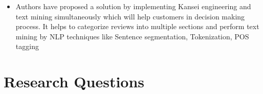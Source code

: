 \documentclass[
  letterpaper,
  DIV=11,
  numbers=noendperiod]{scrreprt}
\providecommand{\tightlist}{%
  \setlength{\itemsep}{0pt}\setlength{\parskip}{0pt}}\usepackage{longtable,booktabs,array}
\begin{document}
\begin{itemize}
\begin{itemize}
    \begin{itemize}
    \tightlist
    \item
      Authors have proposed a solution by implementing Kansei
      engineering and text mining simultaneously which will help
      customers in decision making process. It helps to categorize
      reviews into multiple sections and perform text mining by NLP
      techniques like Sentence segmentation, Tokenization, POS tagging
    \end{itemize}
  \end{itemize}
\end{itemize}

\section{Research Questions}\label{research-questions}
\end{document}
